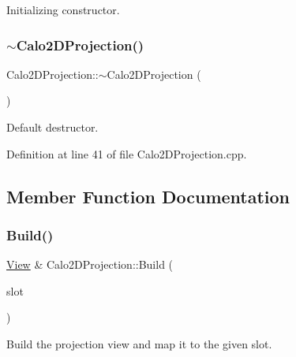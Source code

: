 Initializing constructor. 

\hypertarget{class_d_d4hep_1_1_calo2_d_projection_a955a146f1ac77e119979af591dd3fe71}{}\label{class_d_d4hep_1_1_calo2_d_projection_a955a146f1ac77e119979af591dd3fe71} 
\subsubsection{\texorpdfstring{$\sim$\+Calo2\+D\+Projection()}{~Calo2DProjection()}}
{\footnotesize\ttfamily Calo2\+D\+Projection\+::$\sim$\+Calo2\+D\+Projection (\begin{DoxyParamCaption}{ }\end{DoxyParamCaption})\hspace{0.3cm}{\ttfamily [virtual]}}



Default destructor. 



Definition at line 41 of file Calo2\+D\+Projection.\+cpp.



\subsection{Member Function Documentation}
\hypertarget{class_d_d4hep_1_1_calo2_d_projection_a4ac47f2293dd1af3b2dc1b6311edb170}{}\label{class_d_d4hep_1_1_calo2_d_projection_a4ac47f2293dd1af3b2dc1b6311edb170} 
\subsubsection{\texorpdfstring{Build()}{Build()}}
{\footnotesize\ttfamily \hyperlink{class_d_d4hep_1_1_view}{View} \& Calo2\+D\+Projection\+::\+Build (\begin{DoxyParamCaption}\item[{T\+Eve\+Window $\ast$}]{slot }\end{DoxyParamCaption})\hspace{0.3cm}{\ttfamily [virtual]}}



Build the projection view and map it to the given slot. 



